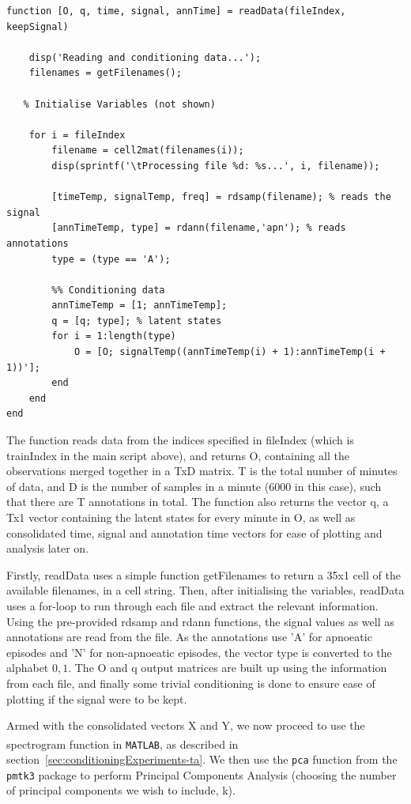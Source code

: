 \begin{lstlisting}
function [O, q, time, signal, annTime] = readData(fileIndex, keepSignal)

    disp('Reading and conditioning data...');
    filenames = getFilenames();

   % Initialise Variables (not shown)

    for i = fileIndex
        filename = cell2mat(filenames(i));
        disp(sprintf('\tProcessing file %d: %s...', i, filename));
        
        [timeTemp, signalTemp, freq] = rdsamp(filename); % reads the signal
        [annTimeTemp, type] = rdann(filename,'apn'); % reads annotations
        type = (type == 'A');

        %% Conditioning data
        annTimeTemp = [1; annTimeTemp];
        q = [q; type]; % latent states
        for i = 1:length(type)
            O = [O; signalTemp((annTimeTemp(i) + 1):annTimeTemp(i + 1))'];
        end
    end
end
\end{lstlisting}

The function reads data from the indices specified in fileIndex (which is trainIndex in the main script above), and returns O, containing all the observations merged together in a TxD matrix. T is the total number of minutes of data, and D is the number of samples in a minute (6000 in this case), such that there are T annotations in total. The function also returns the vector q, a Tx1 vector containing the latent states for every minute in O, as well as consolidated time, signal and annotation time vectors for ease of plotting and analysis later on.

Firstly, readData uses a simple function getFilenames to return a 35x1 cell of the available filenames, in a cell string. Then, after initialising the variables, readData uses a for-loop to run through each file and extract the relevant information. Using the pre-provided rdsamp and rdann functions, the signal values as well as annotations are read from the file. As the annotations use 'A' for apnoeatic episodes and 'N' for non-apnoeatic episodes, the vector type is converted to the alphabet ${0,1}$. The O and q output matrices are built up using the information from each file, and finally some trivial conditioning is done to ensure ease of plotting if the signal were to be kept.

Armed with the consolidated vectors X and Y, we now proceed to use the spectrogram function in \verb!MATLAB!\textsuperscript{\textregistered}, as described in section~\ref{sec:conditioningExperiments-ta}. We then use the \verb!pca! function from the \verb!pmtk3! package to perform Principal Components Analysis (choosing the number of principal components we wish to include, k). 


